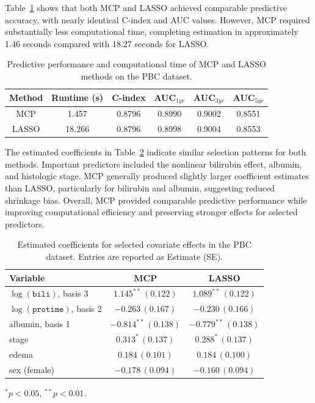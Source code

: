 \documentclass[twoside]{article}
\begin{document}
Table~\ref{tab:performance} shows that both MCP and LASSO achieved comparable predictive accuracy, with nearly identical C-index and AUC values. However, MCP required substantially less computational time, completing estimation in approximately 1.46 seconds compared with 18.27 seconds for LASSO.
\begin{table}[h]
	\begin{center}
		\small
		\caption{Predictive performance and computational time of MCP and LASSO methods on the PBC dataset.}
		\label{tab:performance}
		\begin{tabular}{|c|c|c|c|c|c|}
			\hline
			Method & Runtime (s) & C-index & AUC$_{1yr}$ & AUC$_{3yr}$ & AUC$_{5yr}$ \\ 
			\hline \hline
			MCP 
			& 1.457 
			& 0.8796 
			& 0.8990 
			& 0.9002 
			& 0.8551 \\ 
			
			LASSO 
			& 18.266 
			& 0.8796 
			& 0.8998 
			& 0.9004 
			& 0.8553 \\ 
			\hline
		\end{tabular}
	\end{center}
\end{table}
The estimated coefficients in Table~\ref{tab:coef} indicate similar selection patterns for both methods. Important predictors included the nonlinear bilirubin effect, albumin, and histologic stage. MCP generally produced slightly larger coefficient estimates than LASSO, particularly for bilirubin and albumin, suggesting reduced shrinkage bias. Overall, MCP provided comparable predictive performance while improving computational efficiency and preserving stronger effects for selected predictors.
\begin{table}[h]
	\begin{center}
		\small
		\caption{Estimated coefficients for selected covariate effects in the PBC dataset. Entries are reported as Estimate (SE).}
		\label{tab:coef}
		\begin{tabular}{|l|c|c|}
			\hline
			Variable & MCP & LASSO \\ \hline \hline
			
			$\log(\texttt{bili})$, basis 3
			& $1.145^{**}\,(0.122)$
			& $1.089^{**}\,(0.122)$ \\
			$\log(\texttt{protime})$, basis 2
			& $-0.263\,(0.167)$
			& $-0.230\,(0.166)$ \\
			albumin, basis 1
			& $-0.814^{**}\,(0.138)$
			& $-0.779^{**}\,(0.138)$ \\
			stage
			& $0.313^{*}\,(0.137)$
			& $0.288^{*}\,(0.137)$ \\
			edema
			& $0.184\,(0.101)$
			& $0.184\,(0.100)$ \\
			sex (female)
			& $-0.178\,(0.094)$
			& $-0.160\,(0.094)$ \\
			\hline
		\end{tabular}
		
		\vspace{1mm}
		\footnotesize
		$^{*}p<0.05$, $^{**}p<0.01$.
	\end{center}
\end{table}
\end{document}
